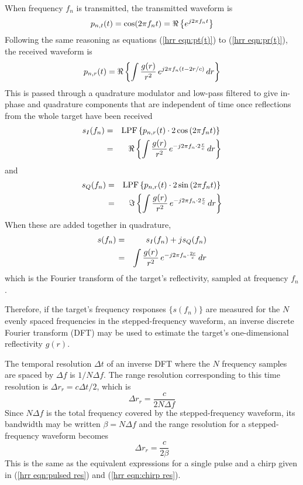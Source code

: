 When frequency $f_n$ is transmitted, the transmitted waveform is
\begin{equation}
p_{n,t}(t)=\cos(2\pi f_n t)=\Re\left\{e^{j2\pi f_n t}\right\}
\end{equation}
Following the same reasoning as equations (\ref{hrr eqn:pt(t)}) to
(\ref{hrr eqn:pr(t)}), the received waveform is
\begin{equation}
p_{n,r}(t)=\Re\left\{\int\frac{g(r)}{r^2}\,e^{j2\pi f_n(t-2r/c)}\,dr\right\}
\end{equation}
This is passed through a quadrature modulator and low-pass filtered to give
in-phase and quadrature components that are independent of time once
reflections from the whole target have been received
\begin{eqnarray}
s_I(f_n)
&=&{\rm LPF}\left\{p_{n,r}(t)\cdot 
	2\cos\left(2\pi f_nt\right)\right\} {\nonumber}\\
&=&\Re\left\{\int\frac{g(r)}{r^2}\,e^{-j2\pi f_n\cdot 2\frac{r}{c}}\,dr\right\} 
\end{eqnarray}
and 
\begin{eqnarray}
s_Q(f_n)
&=&{\rm LPF}\left\{p_{n,r}(t)\cdot 
	2\sin\left(2\pi f_nt\right)\right\} {\nonumber}\\
&=&\Im\left\{\int\frac{g(r)}{r^2}\,e^{-j2\pi f_n\cdot 2\frac{r}{c}}\,dr\right\} 
\end{eqnarray}
When these are added together in quadrature, 
\begin{eqnarray}
s(f_n)
&=&s_I(f_n)+js_Q(f_n){\nonumber}\\
&=&\int\frac{g(r)}{r^2}\,e^{-j2\pi f_n\cdot \frac{2r}{c}}\,dr
\label{hrr eqn:sf s(fn)}
\end{eqnarray}
which is the Fourier transform of the target's reflectivity, sampled
at frequency $f_n$.

Therefore, if the target's frequency responses $\{s(f_n)\}$ are measured for
the $N$ evenly spaced frequencies in the stepped-frequency waveform, an
inverse discrete Fourier transform (DFT) may be used to estimate the
target's one-dimensional reflectivity $g(r)$.  

The temporal resolution $\Delta t$ of an inverse DFT where the $N$ frequency
samples are spaced by $\Delta f$ is $1/N\Delta f$.  The range resolution
corresponding to this time resolution is $\Delta r_r=c\Delta t/2$,
which is
\begin{equation}
\Delta r_r=\frac{c}{2N\Delta f}
\end{equation}
Since $N\Delta f$ is the total frequency covered by the stepped-frequency
waveform, its bandwidth may be written $\beta=N\Delta f$ and the
range resolution for a stepped-frequency waveform becomes
\begin{equation}\label{hrr eqn:sf res}
\Delta r_r=\frac{c}{2\beta}
\end{equation}
This is the same as the equivalent expressions for a single pulse and a 
chirp given in (\ref{hrr eqn:pulsed res}) and (\ref{hrr eqn:chirp res}).


